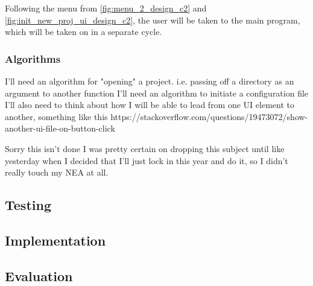 \documentclass[11pt]{article}
\begin{document}
                Following the menu from \autoref{fig:menu_2_design_c2} and \autoref{fig:init_new_proj_ui_design_c2}, the user will be taken to the main program, which will be taken on in a separate cycle.


            \subsubsection{Algorithms}
                I'll need an algorithm for "opening" a project. i.e. passing off a directory as an argument to another function
                I'll need an algorithm to initiate a configuration file
                I'll also need to think about how I will be able to lead from one UI element to another, something like this https://stackoverflow.com/questions/19473072/show-another-ui-file-on-button-click


                Sorry this isn't done I was pretty certain on dropping this subject until like yesterday when I decided that I'll just lock in this year and do it, so I didn't really touch my NEA at all.
                
            
        \subsection{Testing}
        \subsection{Implementation}
        \subsection{Evaluation}
\end{document}
